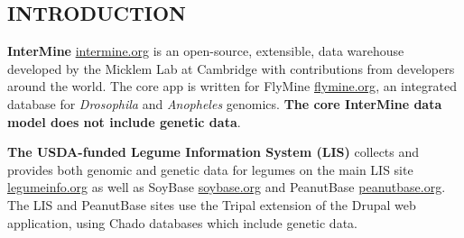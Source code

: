 \documentclass[]{pagposter}
\begin{document}
\color{NCGRBlue}\hrulefill

\color{Black}




\begin{multicols*}{3} %

  \color{Black} %




  \section*{INTRODUCTION}

  \textbf{InterMine} \url{intermine.org} is an open-source, extensible, data warehouse developed by the Micklem Lab at Cambridge with contributions from developers around the world.
  The core app is written for FlyMine \url{flymine.org}, an integrated database for \textit{Drosophila} and \textit{Anopheles} genomics.
  \textbf{The core InterMine data model does not include genetic data}.

  \textbf{The USDA-funded Legume Information System (LIS)} collects and provides both genomic and genetic data for legumes on the main LIS site \url{legumeinfo.org} as well as
  SoyBase \url{soybase.org} and PeanutBase \url{peanutbase.org}. The LIS and PeanutBase sites use the Tripal extension of the Drupal web application, using Chado databases which 
  include genetic data.


\end{multicols*}
\end{document}
